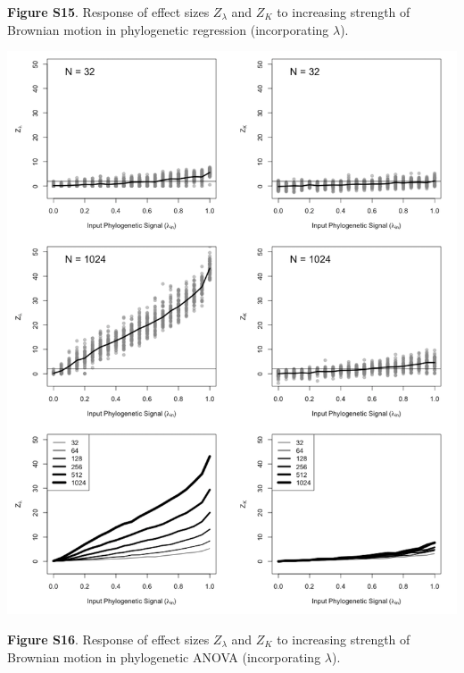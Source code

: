 \documentclass[
]{article}
\begin{document}
\textbf{Figure S15}. Response of effect sizes \(Z_{\lambda}\) and
\(Z_K\) to increasing strength of Brownian motion in phylogenetic
regression (incorporating \(\lambda\)).

\includegraphics[width=0.95\linewidth]{fig.S16}

\textbf{Figure S16}. Response of effect sizes \(Z_{\lambda}\) and
\(Z_K\) to increasing strength of Brownian motion in phylogenetic ANOVA
(incorporating \(\lambda\)).
\end{document}
